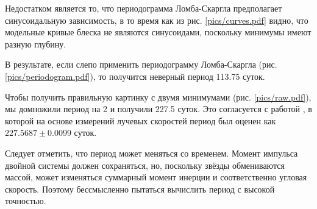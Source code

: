 
Недостатком является то, что периодограмма Ломба-Скаргла предполагает синусоидальную зависимость, в то время как из рис. \ref{pics/curves.pdf} видно, что модельные кривые блеска не являются синусоидами, поскольку минимумы имеют разную глубину.

В результате, если слепо применить периодограмму Ломба-Скаргла (рис. \ref{pics/periodogram.pdf}), то получится неверный период 113.75 суток.

Чтобы получить правильную картинку с двумя минимумами (рис. \ref{pics/raw.pdf}), мы домножили период на 2 и получили 227.5 суток. Это согласуется с работой \cite{RadialVelocities}, в которой на основе измерений лучевых скоростей период был оценен как $227.5687 \pm 0.0099$ суток.

Следует отметить, что период может меняться со временем. Момент импульса двойной системы должен сохраняться, но, поскольку звёзды обмениваются массой, может изменяться суммарный момент инерции и соответственно угловая скорость. Поэтому бессмысленно пытаться вычислить период с высокой точностью.


\label{sect:temperature}












\showbib


